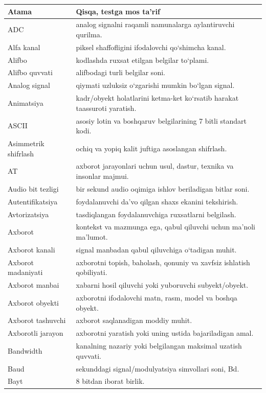 \documentclass[11pt,a4paper,oneside]{book}
\begin{document}
\small
\begin{longtable}{@{}L{38mm}L{127mm}@{}}
\toprule
\textbf{Atama} & \textbf{Qisqa, testga mos ta’rif}\\
\midrule
\endhead
ADC & analog signalni raqamli namunalarga aylantiruvchi qurilma.\\
Alfa kanal & piksel shaffofligini ifodalovchi qo‘shimcha kanal.\\
Alifbo & kodlashda ruxsat etilgan belgilar to‘plami.\\
Alifbo quvvati & alifbodagi turli belgilar soni.\\
Analog signal & qiymati uzluksiz o‘zgarishi mumkin bo‘lgan signal.\\
Animatsiya & kadr/obyekt holatlarini ketma-ket ko‘rsatib harakat taassuroti yaratish.\\
ASCII & asosiy lotin va boshqaruv belgilarining 7 bitli standart kodi.\\
Asimmetrik shifrlash & ochiq va yopiq kalit juftiga asoslangan shifrlash.\\
AT & axborot jarayonlari uchun usul, dastur, texnika va insonlar majmui.\\
Audio bit tezligi & bir sekund audio oqimiga ishlov beriladigan bitlar soni.\\
Autentifikatsiya & foydalanuvchi da’vo qilgan shaxs ekanini tekshirish.\\
Avtorizatsiya & tasdiqlangan foydalanuvchiga ruxsatlarni belgilash.\\
Axborot & kontekst va mazmunga ega, qabul qiluvchi uchun ma’noli ma’lumot.\\
Axborot kanali & signal manbadan qabul qiluvchiga o‘tadigan muhit.\\
Axborot madaniyati & axborotni topish, baholash, qonuniy va xavfsiz ishlatish qobiliyati.\\
Axborot manbai & xabarni hosil qiluvchi yoki yuboruvchi subyekt/obyekt.\\
Axborot obyekti & axborotni ifodalovchi matn, rasm, model va boshqa obyekt.\\
Axborot tashuvchi & axborot saqlanadigan moddiy muhit.\\
Axborotli jarayon & axborotni yaratish yoki uning ustida bajariladigan amal.\\
Bandwidth & kanalning nazariy yoki belgilangan maksimal uzatish quvvati.\\
Baud & sekunddagi signal/modulyatsiya simvollari soni, Bd.\\
Bayt & 8 bitdan iborat birlik.\\

\end{longtable}
\end{document}
